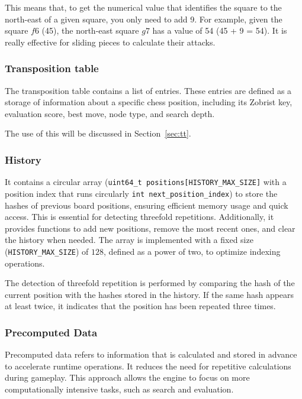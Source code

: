 \noindent This means that, to get the numerical value that identifies the square to the north-east of a given square, you only need to add 9. For example, given the square $f6$ (45), the north-east square $g7$ has a value of 54 (45 + 9 = 54). It is really effective for sliding pieces to calculate their attacks.

\subsubsection{Transposition table}

The transposition table contains a list of entries. These entries are defined as a storage of information about a specific chess position, including its Zobrist key, evaluation score, best move, node type, and search depth.

\vspace{1em}

\noindent The use of this will be discussed in Section~\ref{sec:tt}.

\subsubsection{History}

It contains a circular array (\texttt{uint64\_t positions[HISTORY\_MAX\_SIZE]} with a position index that runs circularly \texttt{int next\_position\_index}) to store the hashes of previous board positions, ensuring efficient memory usage and quick access. This is essential for detecting threefold repetitions. Additionally, it provides functions to add new positions, remove the most recent ones, and clear the history when needed. The array is implemented with a fixed size (\texttt{HISTORY\_MAX\_SIZE}) of \(128\), defined as a power of two, to optimize indexing operations.

\vspace{1em}

\noindent The detection of threefold repetition is performed by comparing the hash of the current position with the hashes stored in the history. If the same hash appears at least twice, it indicates that the position has been repeated three times.

\subsubsection{Precomputed Data}

Precomputed data refers to information that is calculated and stored in advance to accelerate runtime operations. It reduces the need for repetitive calculations during gameplay. This approach allows the engine to focus on more computationally intensive tasks, such as search and evaluation.

